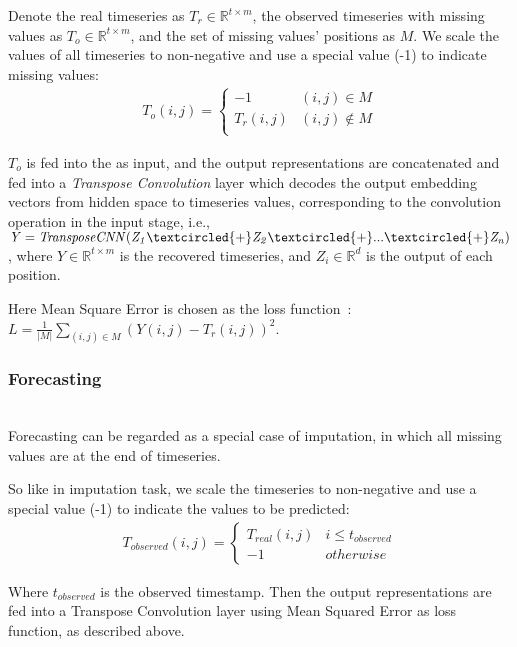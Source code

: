 \begin{sloppypar}
Denote the real timeseries as $T_{r} \in \mathbb{R}^{t \times m}$, the observed timeseries with missing values as $T_{o} \in \mathbb{R}^{t \times m}$, and the set of missing values' positions as $M$. We scale the values of all timeseries to non-negative and use a special value (-1) to indicate missing values:
\vspace{-0.5mm}
\begin{eqnarray}
\label{eq.imp_task}
T_{o}(i,j) =
\begin{cases}
-1   & (i,j) \in M\\
T_{r}(i,j)   & (i,j) \notin M \\
\end{cases}
\end{eqnarray}

$T_{o}$ is fed into the \system as input, and the output representations are concatenated and fed into a {\it Transpose Convolution} layer which decodes the output embedding vectors from hidden space to timeseries values, corresponding to the convolution operation in the input stage, i.e., 
$\mathit{Y=TransposeCNN(Z_1 \textcircled{+} Z_2 \textcircled{+} ... \textcircled{+} Z_n)}$, where $Y \in \mathbb{R}^{t \times m}$ is the recovered timeseries, and $Z_i \in \mathbb{R}^d$ is the output of each position.

Here Mean Square Error is chosen as the loss function~\cite{thompson1990mse}:
$L=\frac{1}{|M|}\sum_{(i,j) \in M} (Y(i,j)-T_{r}(i,j))^2$.

\subsubsection{\textbf{Forecasting}\nopunct}\ \\
Forecasting can be regarded as a special case of imputation, in which all missing values are at the end of timeseries. 

So like in imputation task, we scale the timeseries to non-negative and use a special value (-1) to indicate the values to be predicted:
\begin{eqnarray}
T_{observed}(i,j) =
\begin{cases}
T_{real}(i,j)   & i \leq t_{observed} \\
-1   & otherwise
\end{cases}
\end{eqnarray}

Where $t_{observed}$ is the observed timestamp. Then the output representations are fed into a Transpose Convolution layer using Mean Squared Error as loss function, as described above.


\end{sloppypar}
